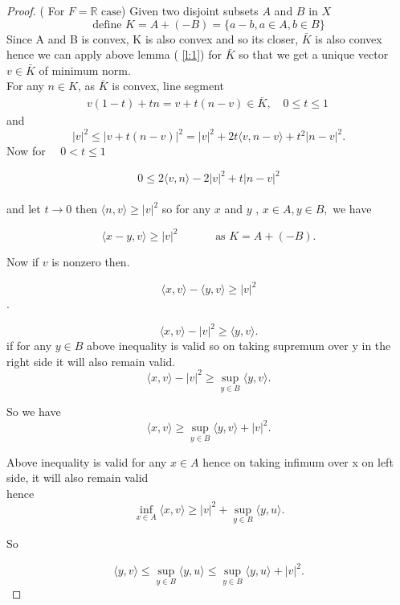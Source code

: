 \documentclass[oneside]{book}
\begin{document}
	
	
	
	
	\begin{proof}( For $ F=\mathbb{R} \text{ case}$)
		Given two disjoint subsets $A$ and $B$ in $X$
		\\
		$$ \text{define }K = A +(-B) = \{ a - b ,a \in A,b \in B\} $$
		Since A and B is convex,  K is also convex and so its closer, $ \bar{K}$ is also convex hence we can apply above lemma ( \ref{l:1}) for $\bar{K}$ so that we get a unique vector $v \in \bar{K}$ of minimum norm. \\
		For any $ n \in K$, as $\bar{K}$ is convex, line segment 
		$$\begin{aligned} v(1-t)+t n=v+t(n-v) \in \bar{K}  , \quad 0 \leq t \leq 1 
		\end{aligned}\ 
		$$    
		and
		$$ |v|^{2} \leq|v+t(n-v)|^{2}=|v|^{2}+2 t\langle v, n-v\rangle +t^{2}|n-v|^{2}.$$
		Now for $ \quad 0 < t \leq 1$    
		
		$$ 0 \leq 2\langle v, n\rangle-2|v|^{2}+t|n-v|^{2}$$
		\\
		and let $t \rightarrow 0$
		then
		$\langle n, v\rangle \geq|v|^{2}$
		so for any $x$ and $y$ , $ x \in A, y \in B,$
		we have 
		
		$$\langle x-y,v \rangle \geq |v|^{2}
		\quad \quad \quad \text{ as } K = A + (-B).$$
		
		Now if $v$ is nonzero then. 
		
		$$\langle x, v\rangle-\langle y, v\rangle \geqslant|v|^{2}$$.
		
		$$\langle x, v\rangle-|v|^{2} \geqslant\langle y, v\rangle.$$
		if for any $y \in B $
		above inequality is valid so on taking supremum over y in the right side it will  also remain valid.
		$$\langle x, v\rangle-|v|^{2} \geqslant \sup_{y \in B}\langle y, v\rangle.$$
		
		So we have
		$$
		\langle x, v \rangle \geqslant\sup_{y\in B}\langle y, v\rangle+|v|^{2}.
		$$
		
		
		Above inequality  is valid for any $x \in A$  hence on taking infimum over x on left side, it will  also remain valid  \\
		hence
		\begin{equation}
			\label{eq4.1}
			\inf _{x \in A}\langle x, v \rangle \geqslant|v|^{2}+\sup _{y \in B}\langle y, u\rangle.
		\end{equation}
		
		
		So
		
		$$ \langle y, v\rangle  \leqslant \sup _{y \in B}\langle y, u\rangle \leqslant  \sup _{y \in B}\langle y, u\rangle + |v|^{2}. $$
		

\end{proof}
\end{document}
